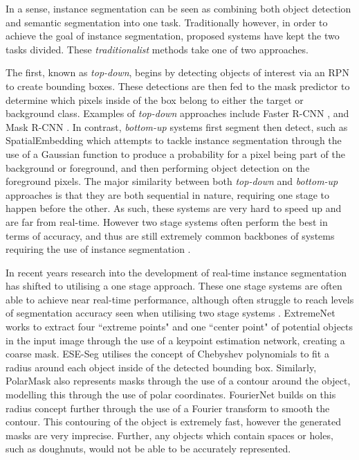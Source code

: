 In a sense, instance segmentation can be seen as combining both object detection and semantic segmentation into one task. Traditionally however, in order to achieve the goal of instance segmentation, proposed systems have kept the two tasks divided. These \textit{traditionalist} methods take one of two approaches. 

The first, known as \textit{top-down}, begins by detecting objects of interest via an RPN to create bounding boxes. These detections are then fed to the mask predictor to determine which pixels inside of the box belong to either the target or background class. Examples of \textit{top-down} approaches include Faster R-CNN \cite{ren_faster_2015}, and Mask R-CNN \cite{he_mask_2017}. In contrast, \textit{bottom-up} systems first segment then detect, such as SpatialEmbedding \cite{neven_instance_2019} which attempts to tackle instance segmentation through the use of a Gaussian function to produce a probability for a pixel being part of the background or foreground, and then performing object detection on the foreground pixels. The major similarity between both \textit{top-down} and \textit{bottom-up} approaches is that they are both sequential in nature, requiring one stage to happen before the other. As such, these systems are very hard to speed up and are far from real-time. However two stage systems often perform the best in terms of accuracy, and thus are still extremely common backbones of systems requiring the use of instance segmentation \cite{soviany_optimizing_2018}.

In recent years research into the development of real-time instance segmentation has shifted to utilising a one stage approach. These one stage systems are often able to achieve near real-time performance, although often struggle to reach levels of segmentation accuracy seen when utilising two stage systems \cite{soviany_optimizing_2018}. ExtremeNet \cite{zhou_bottom-up_2019} works to extract four ``extreme points" and one ``center point" of potential objects in the input image through the use of a keypoint estimation network, creating a coarse mask. ESE-Seg \cite{xu_explicit_2019} utilises the concept of Chebyshev polynomials to fit a radius around each object inside of the detected bounding box. Similarly, PolarMask \cite{xie_polarmask_2020} also represents masks through the use of a contour around the object, modelling this through the use of polar coordinates. FourierNet \cite{riaz_fouriernet_2020} builds on this radius concept further through the use of a Fourier transform to smooth the contour. This contouring of the object is extremely fast, however the generated masks are very imprecise. Further, any objects which contain spaces or holes, such as doughnuts, would not be able to be accurately represented. 

